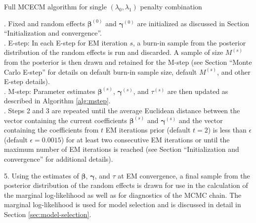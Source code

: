 \begin{algorithm}[h!]
\caption{Full MCECM algorithm for single $(\lambda_0,\lambda_1)$ penalty combination} \label{alg:MCECM}
\begin{algorithmic}
  . Fixed and random effects $\boldsymbol \beta^{(0)}$ and $\boldsymbol \gamma^{(0)}$ are initialized as discussed in Section ``Initialization and convergence''. \\
  . E-step: In each E-step for EM iteration $s$, a burn-in sample from the posterior distribution of the random effects is run and discarded.
  A sample of size $M^{(s)}$ from the posterior is then drawn and retained for the M-step (see Section ``Monte Carlo E-step'' for details on default burn-in sample size, default $M^{(s)}$, and other E-step details). \\
  . M-step: Parameter estimates $\boldsymbol \beta^{(s)}$, $\boldsymbol \gamma^{(s)}$, and $\tau^{(s)}$ are then updated as described in Algorithm \ref{alg:mstep}. \\
  . Steps 2 and 3 are repeated until the average Euclidean distance between the vector containing the current coefficients $\boldsymbol \beta^{(s)}$ and $\boldsymbol \gamma^{(s)}$ and the vector containing the coefficients from $t$ EM iterations prior (default $t=2$) is less than $\epsilon$ (default $\epsilon=0.0015$) for at least two consecutive EM iterations or until the maximum number of EM iterations is reached (see Section ``Initialization and convergence'' for additional details). \\
  \item 5. Using the estimates of $\boldsymbol \beta$, $\boldsymbol \gamma$, and $\tau$ at EM convergence, a final sample from the posterior distribution of the random effects is drawn for use in the calculation of the marginal log-likelihood as well as for diagnostics of the MCMC chain. The marginal log-likelihood is used for model selection and is discussed in detail in Section \ref{sec:model-selection}.
\end{algorithmic}
\end{algorithm}



